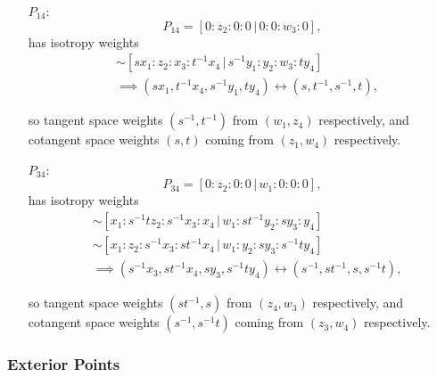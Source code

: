 \documentclass{article}
\begin{document}
\begin{itemize}
		\item[$P_{14}$:]
		\[
		P_{14} = [ 0 : z_{2} : 0 : 0 \, | \, 0 : 0: w_{3} : 0 ],
		\]
		has isotropy weights
		\begin{align*}
			[sx_{1} : tz_{2} : x_{3} : z_{4} \, | \, s^{-1}y_{1} : t^{-1}y_{2} : w_{3} : y_{4}] &\sim [sx_{1} : z_{2} : x_{3} : t^{-1}x_{4} \, | \, s^{-1}y_{1} : y_{2} :w_{3} : ty_{4}] \\ &\implies (sx_{1}, t^{-1}x_{4}, s^{-1}y_{1}, ty_{4}) \longleftrightarrow (s, t^{-1}, s^{-1}, t),
		\end{align*}
		
		so tangent space weights $(s^{-1},t^{-1})$ from $(w_{1}, z_{4})$ respectively, and cotangent space weights $(s,t)$ coming from $(z_{1}, w_{4})$ respectively.
		
		\item[$P_{34}$:]
		\[
		P_{34} = [ 0 : z_{2} : 0 : 0 \, | \, w_{1} : 0: 0 : 0 ],
		\]
		has isotropy weights
		\begin{align*}
			[sx_{1} : tz_{2} : x_{3} : x_{4} \, | \, s^{-1}w_{1} : t^{-1}y_{2} : y_{3} : y_{4}] &\sim [x_{1} : s^{-1}tz_{2} : s^{-1}x_{3} : x_{4} \, | \, w_{1} : st^{-1}y_{2} : sy_{3} : y_{4}] \\ &\sim [x_{1} : z_{2} : s^{-1}x_{3} : st^{-1}x_{4} \, | \, w_{1} : y_{2} : sy_{3} : s^{-1}ty_{4}] \\ &\implies (s^{-1}x_{3}, st^{-1}x_{4}, sy_{3}, s^{-1}ty_{4}) \longleftrightarrow (s^{-1}, st^{-1}, s, s^{-1}t),
		\end{align*}
		
		so tangent space weights $(st^{-1}, s)$ from $(z_{4}, w_{3})$ respectively, and cotangent space weights $(s^{-1}, s^{-1}t)$ coming from $(z_{3}, w_{4})$ respectively.
		
	\end{itemize}
	
	
	\subsubsection{Exterior Points}
	
\end{document}

